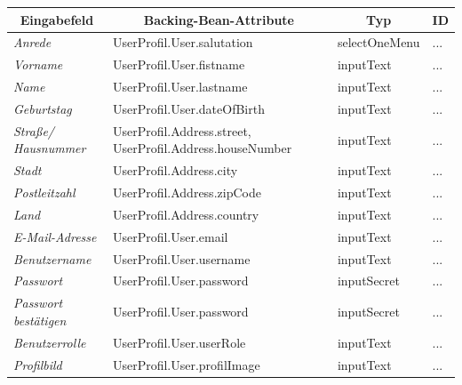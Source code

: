 \begin{itemize}
				\begin{center}
					\begin{longtable}{|p{3cm} |p{5cm} | p{4cm}|p{3cm}|}
						
						\hline \multicolumn{1}{|c|}{\textbf{Eingabefeld}} & \multicolumn{1}{|c|}{\textbf{Backing-Bean-Attribute}} & \multicolumn{1}{|c|}{\textbf{Typ}}  &  \multicolumn{1}{|c|}{\textbf{ID}} \\ \hline
						\endfirsthead
						\hline
						\endlastfoot
						\textit{Anrede} & UserProfil.User.salutation & selectOneMenu & ... \\ \hline
						\textit{Vorname} & UserProfil.User.fistname & inputText & ... \\ \hline
						\textit{Name} & UserProfil.User.lastname & inputText & ... \\ \hline
						\textit{Geburtstag } & UserProfil.User.dateOfBirth & inputText & ... \\ \hline
						\textit{Straße/ Hausnummer} & UserProfil.Address.street, UserProfil.Address.houseNumber  & inputText & ...\\ \hline
						\textit{Stadt} & UserProfil.Address.city & inputText & ... \\ \hline
						\textit{Postleitzahl} & UserProfil.Address.zipCode & inputText & ... \\ \hline
						\textit{Land} & UserProfil.Address.country & inputText & ... \\ \hline
						\textit{E-Mail-Adresse} & UserProfil.User.email & inputText & ...\\ \hline
						\textit{Benutzername} & UserProfil.User.username & inputText & ... \\ \hline
						\textit{Passwort} & UserProfil.User.password  & inputSecret & ... \\ \hline
						\textit{Passwort bestätigen} & UserProfil.User.password & inputSecret & ... \\ \hline
						\textit{Benutzerrolle} & UserProfil.User.userRole & inputText & ... \\ \hline
						\textit{Profilbild} & UserProfil.User.profilImage & inputText & ... \\ \hline
					\end{longtable}
				\end{center}
				
				\begin{center}
					\begin{longtable}{|p{3cm} |p{8cm} | p{5cm}|}
						

\end{longtable}
\end{center}
\end{itemize}
